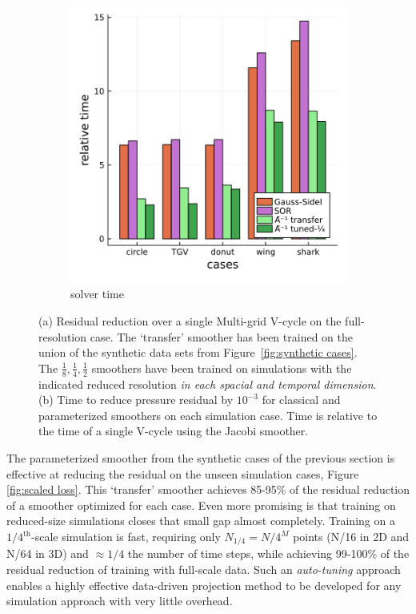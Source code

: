 \documentclass[review]{elsarticle}
\begin{document}
\begin{figure}
\begin{subfigure}[b]{0.47\textwidth}
        \includegraphics[width=\textwidth]{figures/crosscount.png}
        \caption{solver time}
        \label{fig:simulation time}
    \end{subfigure}
        \caption{(a) Residual reduction over a single Multi-grid V-cycle on the full-resolution case. The `transfer' smoother has been trained on the union of the synthetic data sets from Figure~\ref{fig:synthetic cases}. The $\frac 18, \frac 14, \frac 12$ smoothers have been trained on simulations with the indicated reduced resolution \textit{in each spacial and temporal dimension}. (b) Time to reduce pressure residual by $10^{-3}$ for classical and parameterized smoothers on each simulation case. Time is relative to the time of a single V-cycle using the Jacobi smoother.}
        \label{fig:tuned simulation}
\end{figure}

The parameterized smoother from the synthetic cases of the previous section is effective at reducing the residual on the unseen simulation cases, Figure \ref{fig:scaled loss}. This `transfer' smoother achieves 85-95\% of the residual reduction of a smoother optimized for each case. Even more promising is that training on reduced-size simulations closes that small gap almost completely. Training on a $1/4^\text{th}$-scale simulation is fast, requiring only $N_{1/4} = N/4^M$ points (N/16 in 2D and N/64 in 3D) and $\approx 1/4$ the number of time steps, while achieving 99-100\% of the residual reduction of training with full-scale data. Such an \textit{auto-tuning} approach enables a highly effective data-driven projection method to be developed for any simulation approach with very little overhead.
\end{document}
